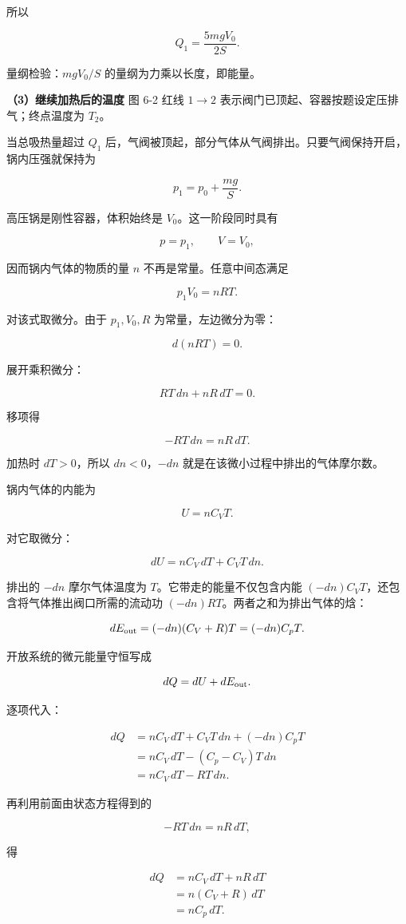 \documentclass[12pt,a4paper,UTF8]{ctexart}
\begin{document}
所以

\[\boxed{Q_1=\frac{5mgV_0}{2S}}.\]

量纲检验：\(mgV_0/S\) 的量纲为力乘以长度，即能量。

\textbf{（3）继续加热后的温度} 图 6-2 红线 \(1\to2\)
表示阀门已顶起、容器按题设定压排气；终点温度为 \(T_2\)。

当总吸热量超过 \(Q_1\)
后，气阀被顶起，部分气体从气阀排出。只要气阀保持开启，锅内压强就保持为

\[p_1=p_0+\frac{mg}{S}.\]

高压锅是刚性容器，体积始终是 \(V_0\)。这一阶段同时具有

\[p=p_1,\qquad V=V_0,\]

因而锅内气体的物质的量 \(n\) 不再是常量。任意中间态满足

\[p_1V_0=nRT.\]

对该式取微分。由于 \(p_1,V_0,R\) 为常量，左边微分为零：

\[d(nRT)=0.\]

展开乘积微分：

\[RT\,dn+nR\,dT=0.\]

移项得

\[-RT\,dn=nR\,dT.\]

加热时 \(dT>0\)，所以 \(dn<0\)，\(-dn\)
就是在该微小过程中排出的气体摩尔数。

锅内气体的内能为

\[U=nC_VT.\]

对它取微分：

\[dU=nC_V\,dT+C_VT\,dn.\]

排出的 \(-dn\) 摩尔气体温度为 \(T\)。它带走的能量不仅包含内能
\((-dn)C_VT\)，还包含将气体推出阀口所需的流动功
\((-dn)RT\)。两者之和为排出气体的焓：

\[dE_{\rm out}=(-dn)(C_V+R)T=(-dn)C_pT.\]

开放系统的微元能量守恒写成

\[dQ=dU+dE_{\rm out}.\]

逐项代入：

\[\begin{aligned}
dQ
&=nC_V\,dT+C_VT\,dn+(-dn)C_pT\\
&=nC_V\,dT-(C_p-C_V)T\,dn\\
&=nC_V\,dT-RT\,dn.
\end{aligned}\]

再利用前面由状态方程得到的

\[-RT\,dn=nR\,dT,\]

得

\[\begin{aligned}
dQ
&=nC_V\,dT+nR\,dT\\
&=n(C_V+R)\,dT\\
&=nC_p\,dT.
\end{aligned}\]
\end{document}
